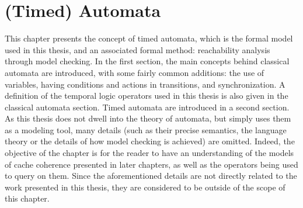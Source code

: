 \chapter{(Timed) Automata}
\label{cha:formal_methods}
\label{cha:timed_automata}
This chapter presents the concept of timed automata, which is the formal model
used in this thesis, and an associated formal method: reachability analysis
through model checking. In the first section, the main concepts behind
classical automata are introduced, with some fairly common additions: the use
of variables, having conditions and actions in transitions, and
synchronization. A definition of the temporal logic operators used in this
thesis is also given in the classical automata section. Timed automata are
introduced in a second section. As this thesis does not dwell into the theory
of automata, but simply uses them as a modeling tool, many details (such as
their precise semantics, the language theory or the details of how model
checking is achieved) are omitted.  Indeed, the objective of the chapter is for
the reader to have an understanding of the models of cache coherence presented
in later chapters, as well as the operators being used to query on them. Since
the aforementioned details are not directly related to the work presented in
this thesis, they are considered to be outside of the scope of this chapter.




